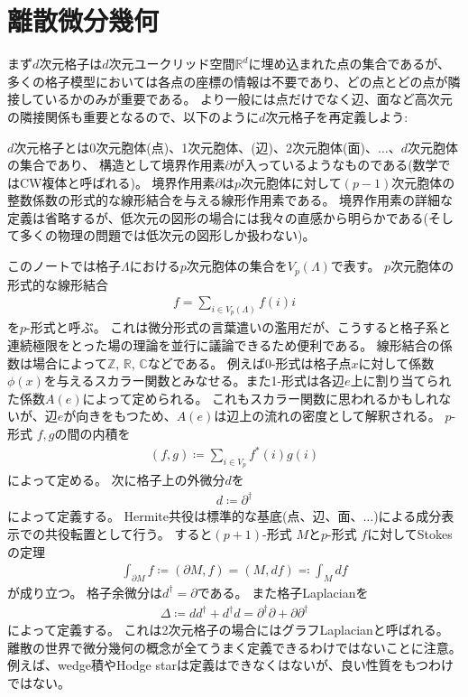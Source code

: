 \documentclass[12pt]{ltjsarticle}
\begin{document}
\section{離散微分幾何}
まず$d$次元格子は$d$次元ユークリッド空間$ℝ^d$に埋め込まれた点の集合であるが、多くの格子模型においては各点の座標の情報は不要であり、どの点とどの点が隣接しているかのみが重要である。
より一般には点だけでなく辺、面など高次元の隣接関係も重要となるので、以下のように$d$次元格子を再定義しよう:

$d$次元格子とは0次元胞体(点)、1次元胞体、(辺)、2次元胞体(面)、$…$、$d$次元胞体の集合であり、
構造として境界作用素$∂$が入っているようなものである(数学ではCW複体と呼ばれる)。
境界作用素$∂$は$p$次元胞体に対して$(p-1)$次元胞体の整数係数の形式的な線形結合を与える線形作用素である。
境界作用素の詳細な定義は省略するが、低次元の図形の場合には我々の直感から明らかである(そして多くの物理の問題では低次元の図形しか扱わない)。

このノートでは格子$Λ$における$p$次元胞体の集合を$V_p(Λ)$で表す。
$p$次元胞体の形式的な線形結合
\begin{align}
    f = ∑_{i ∈ V_p(Λ)} f(i) i
\end{align}
を$p$-形式と呼ぶ。
これは微分形式の言葉遣いの濫用だが、こうすると格子系と連続極限をとった場の理論を並行に議論できるため便利である。
線形結合の係数は場合によって$ℤ$, $ℝ$, $ℂ$などである。
例えば0-形式は格子点$x$に対して係数$ϕ(x)$を与えるスカラー関数とみなせる。また1-形式は各辺$e$上に割り当てられた係数$A(e)$によって定められる。
これもスカラー関数に思われるかもしれないが、辺$e$が向きをもつため、$A(e)$は辺上の流れの密度として解釈される。
$p$-形式 $f, g$の間の内積を
\begin{align}
    (f, g) ≔ ∑_{i ∈ V_p} f^*(i) g(i)
\end{align}
によって定める。
次に格子上の外微分$𝑑$を
\begin{align}
    𝑑 ≔ ∂^†
\end{align}
によって定義する。
Hermite共役は標準的な基底(点、辺、面、$…$)による成分表示での共役転置として行う。
すると$(p+1)$-形式 $M$と$p$-形式 $f$に対してStokesの定理
\begin{align}
    ∫_{∂M}f ≔ (∂M, f) = (M, 𝑑f) ≕ ∫_M 𝑑f
\end{align}
が成り立つ。
格子余微分は$𝑑^† = ∂$である。
また格子Laplacianを
\begin{align}
    Δ ≔ 𝑑𝑑^† + 𝑑^†𝑑 = ∂^†∂+∂∂^†
\end{align}
によって定義する。
これは2次元格子の場合にはグラフLaplacianと呼ばれる。
離散の世界で微分幾何の概念が全てうまく定義できるわけではないことに注意。
例えば、wedge積やHodge starは定義はできなくはないが、良い性質をもつわけではない。
\end{document}
